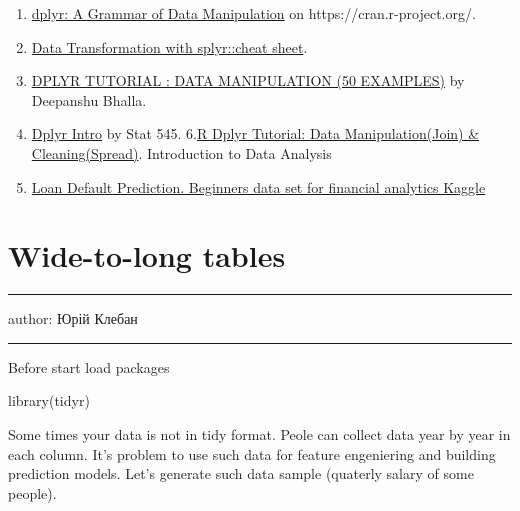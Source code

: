 \documentclass[
  letterpaper,
  DIV=11,
  numbers=noendperiod]{scrreprt}
\newenvironment{Shaded}{\begin{snugshade}}{\end{snugshade}}
\newcommand{\FunctionTok}[1]{\textcolor[rgb]{0.28,0.35,0.67}{#1}}
\newcommand{\NormalTok}[1]{\textcolor[rgb]{0.00,0.23,0.31}{#1}}
\providecommand{\tightlist}{%
  \setlength{\itemsep}{0pt}\setlength{\parskip}{0pt}}\usepackage{longtable,booktabs,array}
\begin{document}
\begin{enumerate}
\def\labelenumi{\arabic{enumi}.}
\tightlist
\item
  \href{https://cran.r-project.org/web/packages/dplyr/index.html}{dplyr:
  A Grammar of Data Manipulation} on https://cran.r-project.org/.
\item
  \href{https://github.com/rstudio/cheatsheets/blob/master/data-transformation.pdf}{Data
  Transformation with splyr::cheat sheet}.
\item
  \href{https://www.listendata.com/2016/08/dplyr-tutorial.html}{DPLYR
  TUTORIAL : DATA MANIPULATION (50 EXAMPLES)} by Deepanshu Bhalla.
\item
  \href{https://stat545.com/dplyr-intro.html}{Dplyr Intro} by Stat 545.
  6.\href{https://www.guru99.com/r-dplyr-tutorial.html}{R Dplyr
  Tutorial: Data Manipulation(Join) \& Cleaning(Spread)}. Introduction
  to Data Analysis
\item
  \href{https://www.kaggle.com/kmldas/loan-default-prediction}{Loan
  Default Prediction. Beginners data set for financial analytics Kaggle}
\end{enumerate}

\chapter{Wide-to-long tables}\label{wide-to-long-tables}

\begin{center}\rule{0.5\linewidth}{0.5pt}\end{center}

author: Юрій Клебан

\begin{center}\rule{0.5\linewidth}{0.5pt}\end{center}

Before start load packages

\begin{Shaded}
\begin{Highlighting}[]
\FunctionTok{library}\NormalTok{(tidyr)}
\end{Highlighting}
\end{Shaded}

Some times your data is not in tidy format. Peole can collect data year
by year in each column. It's problem to use such data for feature
engeniering and building prediction models. Let's generate such data
sample (quaterly salary of some people).
\end{document}
